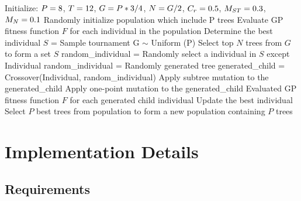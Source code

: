 \begin{ZhChapter}
\begin{algorithm}
    \caption{Efficiency-based GP to generate loss function}\label{alg:cap}
    \begin{algorithmic}
        \State Initialize: \space $P = \space 8$, $T =\space 12$, $G =\space P*3/4$, $N = \space G/2$, $C_r = \space0.5$, $M_{ST} = \space0.3$, $M_N = \space0.1$
        \State Randomly initialize population which include P trees
        \State Evaluate GP fitness function $F$ for each individual in the population
        \State Determine the best individual
        \State $S$ = Sample tournament G $\sim$ Uniform (P)
        \State Select top $N$ trees from $G$ to form a set $S$
        \State random\_individual = Randomly select a individual in $S$ except Individual
        \Else
        \State random\_individual = Randomly generated tree
        \EndIf
        \State generated\_child = Crossover(Individual, random\_individual)
        \State Apply subtree mutation to the generated\_child
        \EndIf
        \State Apply one-point mutation to the generated\_child
        \EndIf
        \EndFor
        \State Evaluated GP fitness function $F$ for each generated child individual
        \State Update the best individual
        \State Select $P$ best trees from population to form a new population containing $P$ trees
        \EndWhile
    \end{algorithmic}
\end{algorithm}

\section{Implementation Details}

\subsection{Requirements}

\begin{table*}[htbp]
\centering
\caption{Software requirements} \label{tab: softwareSpec}
\end {table*}


\end{ZhChapter}
